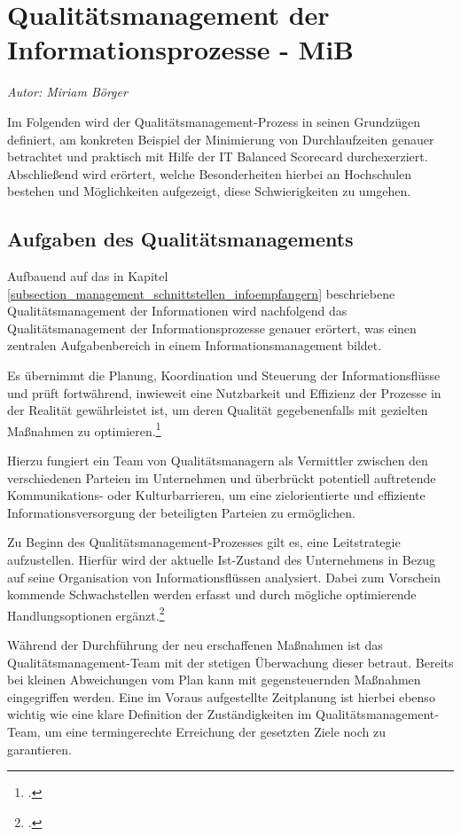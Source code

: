 \section{Qualitätsmanagement der Informationsprozesse - MiB}
\textit{Autor: Miriam Börger}


Im Folgenden wird der Qualitätsmanagement-Prozess in seinen Grundzügen definiert, 
am konkreten Beispiel der Minimierung von Durchlaufzeiten genauer betrachtet und 
praktisch mit Hilfe der IT Balanced Scorecard durchexerziert. 
Abschließend wird erörtert, welche Besonderheiten hierbei an Hochschulen bestehen 
und Möglichkeiten aufgezeigt, diese Schwierigkeiten zu umgehen.

\subsection{Aufgaben des Qualitätsmanagements}
Aufbauend auf das in Kapitel \ref{subsection_management_schnittstellen_infoempfangern} beschriebene Qualitätsmanagement der Informationen 
wird nachfolgend das Qualitätsmanagement der Informationsprozesse genauer erörtert, was 
einen zentralen Aufgabenbereich in einem Informationsmanagement bildet.

Es übernimmt die Planung, Koordination und Steuerung der Informationsflüsse und prüft fortwährend, inwieweit eine Nutzbarkeit und Effizienz der Prozesse in der Realität gewährleistet ist, um deren Qualität gegebenenfalls mit gezielten Maßnahmen zu optimieren.\footcite[34 ff.]{schroder_wertorientiertes_2005}

Hierzu fungiert ein Team von Qualitätsmanagern als Vermittler zwischen den verschiedenen Parteien im Unternehmen und überbrückt potentiell auftretende Kommunikations- oder Kulturbarrieren, um eine zielorientierte und effiziente Informationsversorgung der beteiligten Parteien zu ermöglichen.

Zu Beginn des Qualitätsmanagement-Prozesses gilt es, eine Leitstrategie aufzustellen. Hierfür wird der aktuelle Ist-Zustand des Unternehmens in Bezug auf seine Organisation von Informationsflüssen analysiert. Dabei zum Vorschein kommende Schwachstellen werden erfasst und durch mögliche optimierende Handlungsoptionen ergänzt.\footcite{helmke_management_2013}

Während der Durchführung der neu erschaffenen Maßnahmen ist das 
Qualitätsmanagement-Team mit der stetigen Überwachung dieser betraut. 
Bereits bei kleinen Abweichungen vom Plan kann mit gegensteuernden Maßnahmen 
eingegriffen werden. Eine im Voraus aufgestellte Zeitplanung ist hierbei ebenso wichtig wie 
eine klare Definition der Zuständigkeiten im Qualitätsmanagement-Team, um eine 
termingerechte Erreichung der gesetzten Ziele noch zu garantieren.

